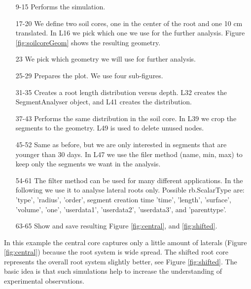 \begin{itemize}

\item[9-15] Performs the simulation.

\item[17-20] We define two soil cores, one in the center of the root and one 10 cm translated. In L16 we pick which one we use for the further analysis.  Figure \ref{fig:soilcoreGeom} shows the resulting geometry.

\item[23] We pick which geometry we will use for further analysis.

\item[25-29] Prepares the plot. We use four sub-figures. 

\item[31-35] Creates a root length distribution versus depth. L32 creates the SegmentAnalyser object, and L41 creates the distribution.

\item[37-43] Performs the same distribution in the soil core. In L39 we crop the segments to the geometry. L49 is used to delete unused nodes. 

\item[45-52] Same as before, but we are only interested in segments that are younger than 30 days. In L47 we use the filer method (name, min, max) to keep only the segments we want in the analysis. 

\item[54-61] The filter method can be used for many different applications. In the following we use it to analyse lateral roots only. Possible rb.ScalarType are: 'type', 'radius', 'order', segment creation time 'time', 'length', 'surface', 'volume', 'one', 'userdata1', 'userdata2', 'userdata3', and 'parenttype'.

\item[63-65] Show and save resulting Figure \ref{fig:central}, and \ref{fig:shifted}.

\end{itemize}

In this example the central core captures only a little amount of laterals (Figure \ref{fig:central}) because the root system is wide spread. 
The shifted root core represents the overall root system slightly better, see Figure \ref{fig:shifted}.  
The basic idea is that such simulations help to increase the understanding of experimental observations.

